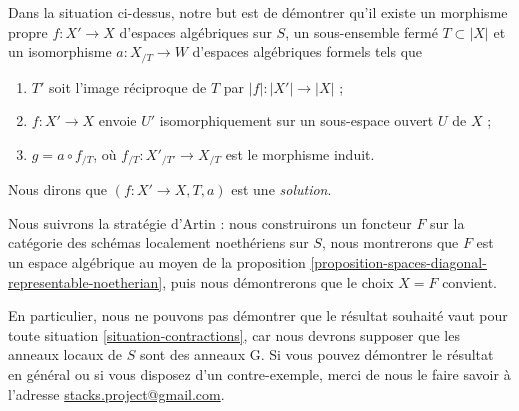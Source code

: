 \noindent
Dans la situation ci-dessus, notre but est de démontrer qu'il existe un
morphisme propre $f : X' \to X$ d'espaces algébriques sur $S$, un sous-ensemble
fermé $T \subset |X|$ et un isomorphisme $a : X_{/T} \to W$ d'espaces
algébriques formels tels que
\begin{enumerate}
\item $T'$ soit l'image réciproque de $T$ par $|f| : |X'| \to |X|$ ;
\item $f : X' \to X$ envoie $U'$ isomorphiquement sur un sous-espace ouvert
$U$ de $X$ ;
\item $g = a \circ f_{/T}$, où $f_{/T} : X'_{/T'} \to X_{/T}$ est le morphisme
induit.
\end{enumerate}
Nous dirons que $(f : X' \to X, T, a)$ est une {\it solution}.

\medskip\noindent
Nous suivrons la stratégie d'Artin : nous construirons un foncteur $F$ sur la
catégorie des schémas localement noethériens sur $S$, nous montrerons que $F$
est un espace algébrique au moyen de la proposition
\ref{proposition-spaces-diagonal-representable-noetherian}, puis nous
démontrerons que le choix $X = F$ convient.

\begin{remark}
\label{remark-G-rings}
En particulier, nous ne pouvons pas démontrer que le résultat souhaité vaut
pour toute situation \ref{situation-contractions}, car nous devrons supposer
que les anneaux locaux de $S$ sont des anneaux G. Si vous pouvez démontrer le
résultat en général ou si vous disposez d'un contre-exemple, merci de nous le
faire savoir à l'adresse
\href{mailto:stacks.project@gmail.com}{stacks.project@gmail.com}.
\end{remark}

